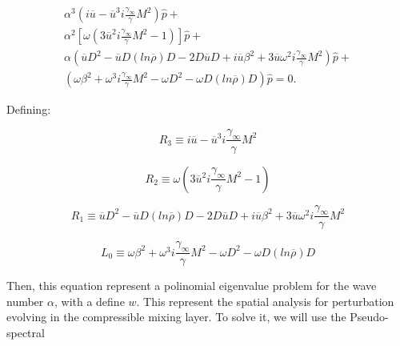 \begin{equation*} 
\begin{split}
\alpha^3
\left(
    i
    \overline{u}
    -
    \overline{u}^3
    i
    \frac{\gamma_\infty}{\gamma}
    M^{2}
\right) \hat{p} 
+ 
\\ 
\alpha^2 
\left[ 
    \omega
    \left(
    3
    \overline{u}^2
    i
    \frac{\gamma_\infty}{\gamma}
    M^{2}
    -
    1
    \right)
\right]
\hat{p}
+
\\
\alpha 
\left(
    \overline{u}
    D^2
    -
     \overline{u}
    D (ln\overline{\rho})
    D
    -
    2
    D\overline{u}
    D
    +
    i
    \overline{u}
    \beta^2
    +
    3
    \overline{u}\omega^2
    i
    \frac{\gamma_\infty}{\gamma}
    M^{2}
\right)
\hat{p}
+
\\
\left(
\omega
\beta^2
+
\omega^3
i
\frac{\gamma_\infty}{\gamma}
M^{2}
-
\omega 
D^2
-
\omega
D (ln\overline{\rho})
D
\right)
\hat{p}
=
0
.
\end{split}
\end{equation*} 

Defining:

\begin{equation} 
    R_3
    \equiv
    i
    \overline{u}
    -
    \overline{u}^3
    i
    \frac{\gamma_\infty}{\gamma}
    M^{2}
\end{equation} 

\begin{equation} 
    R_2
    \equiv
    \omega
    \left(
    3
    \overline{u}^2
    i
    \frac{\gamma_\infty}{\gamma}
    M^{2}
    -
    1
    \right)
\end{equation} 

\begin{equation} 
    R_1
    \equiv
    \overline{u}
    D^2
    -
     \overline{u}
    D (ln\overline{\rho})
    D
    -
    2
    D\overline{u}
    D
    +
    i
    \overline{u}
    \beta^2
    +
    3
    \overline{u}\omega^2
    i
    \frac{\gamma_\infty}{\gamma}
    M^{2}
\end{equation} 


\begin{equation} 
L_0
\equiv
\omega
\beta^2
+
\omega^3
i
\frac{\gamma_\infty}{\gamma}
M^{2}
-
\omega 
D^2
-
\omega
D (ln\overline{\rho})
D
\end{equation} 

Then, this equation represent a polinomial eigenvalue problem for the wave
number $\alpha$, with a define $w$. 
This represent the spatial analysis for perturbation evolving  
in the compressible mixing layer. 
To solve it, we will use the Pseudo-spectral 

